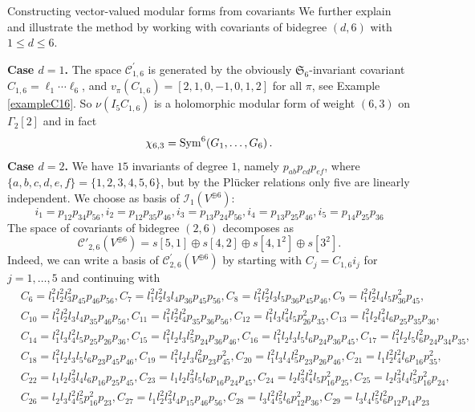 \documentclass[12pt]{amsart}
\numberwithin{equation}{section}
\def\leq{\leqslant}
\numberwithin{equation}{section}
\theoremstyle{definition}
\theoremstyle{remark}
\begin{document}
\begin{section}{Constructing vector-valued modular forms from covariants}
\bigskip
We further explain and illustrate the method by working with covariants of bidegree $(d,6)$
with $1 \leq d \leq 6$. 


\noindent
{\bf Case $d=1$.} The space 
$\mathcal{C}^{\prime}_{1,6}$ is generated by the obviously $\mathfrak{S}_6$-invariant 
covariant $C_{1,6}=\ell_1\cdots \ell_6$,
and $v_{\pi}(C_{1,6})=[2,1,0,-1,0,1,2]$ for all $\pi$, see Example \ref{exampleC16}. 
So $\nu(I_5C_{1,6})$ is a holomorphic modular form  
of weight $(6,3)$ on $\Gamma_2[2]$ and in fact
$$
\chi_{6,3}= {\rm Sym}^6(G_1,\ldots,G_6) \, .
$$
{\bf Case $d=2$.} 
We have $15$ invariants of degree $1$, namely $p_{ab}p_{cd}p_{ef}$, where
$\{a,b,c,d,e,f\}=\{1,2,3,4,5,6\}$, but by the Pl\"ucker relations only five
are linearly independent. We choose as basis of $\mathcal{I}_1(V^{\oplus 6})$:
\[
i_1=p_{12}p_{34}p_{56}, 
i_2=p_{12}p_{35}p_{46}, 
i_3=p_{13}p_{24}p_{56}, 
i_4=p_{13}p_{25}p_{46}, 
i_5=p_{14}p_{25}p_{36}
\]
The space of covariants of bidegree $(2,6)$ decomposes as
\[
\mathcal{C}'_{2,6}(V^{\oplus 6})=s[5,1]\oplus s[4,2]\oplus s[4,1^2] \oplus s[3^2].
\]
Indeed, we can write a basis of $\mathcal{C}_{2,6}^{\prime}(V^{\oplus 6})$  by starting with
$C_{j} = C_{1,6} i_{j}$ for $j=1,\ldots,5$ 
and continuing with
\begin{align*}
&C_{6} = l_{1}^{2} l_{2}^{2} l_{3}^{2} p_{45} p_{46} p_{56}, 
C_{7} = l_{1}^{2} l_{2}^{2} l_{3} l_{4} p_{36} p_{45} p_{56}, 
C_{8} = l_{1}^{2} l_{2}^{2} l_{3} l_{5} p_{36} p_{45} p_{46}, 
C_{9} = l_{1}^{2} l_{2}^{2} l_{4} l_{5} p_{36}^{2} p_{45}, \\
&C_{10} = l_{1}^{2} l_{2}^{2} l_{3} l_{4} p_{35} p_{46} p_{56}, 
C_{11} = l_{1}^{2} l_{2}^{2} l_{4}^{2} p_{35} p_{36} p_{56}, 
C_{12} = l_{1}^{2} l_{3} l_{4}^{2} l_{5} p_{26}^{2} p_{35}, 
C_{13} = l_{1}^{2} l_{2} l_{4}^{2} l_{6} p_{25} p_{35} p_{36}, \\
&C_{14} = l_{1}^{2} l_{3} l_{4}^{2} l_{5} p_{25} p_{26} p_{36}, 
C_{15} = l_{1}^{2} l_{2} l_{3} l_{5}^{2} p_{24} p_{36} p_{46}, 
C_{16} = l_{1}^{2} l_{2} l_{3} l_{5} l_{6} p_{24} p_{36} p_{45}, 
C_{17} = l_{1}^{2} l_{2} l_{5} l_{6}^{2} p_{24} p_{34} p_{35}, \\
&C_{18} = l_{1}^{2} l_{2} l_{3} l_{5} l_{6} p_{23} p_{45} p_{46}, 
C_{19} = l_{1}^{2} l_{2} l_{3} l_{6}^{2} p_{23} p_{45}^{2}, 
C_{20} = l_{1}^{2} l_{3} l_{4} l_{5}^{2} p_{23} p_{26} p_{46}, 
C_{21} = l_{1} l_{2}^{2} l_{4}^{2} l_{6} p_{16} p_{35}^{2}, \\
&C_{22} = l_{1} l_{2} l_{3}^{2} l_{4} l_{6} p_{16} p_{25} p_{45}, 
C_{23} = l_{1} l_{2} l_{3}^{2} l_{5} l_{6} p_{16} p_{24} p_{45}, 
C_{24} = l_{2} l_{3}^{2} l_{4}^{2} l_{5} p_{16}^{2} p_{25}, 
C_{25} = l_{2} l_{3}^{2} l_{4} l_{5}^{2} p_{16}^{2} p_{24}, \\
&C_{26} = l_{2} l_{3} l_{4}^{2} l_{5}^{2} p_{16}^{2} p_{23}, 
C_{27} = l_{1} l_{2}^{2} l_{3}^{2} l_{4} p_{15} p_{46} p_{56}, 
C_{28} = l_{3} l_{4}^{2} l_{5}^{2} l_{6} p_{12}^{2} p_{36}, 
C_{29} = l_{3} l_{4} l_{5}^{2} l_{6}^{2} p_{12} p_{14} p_{23}
\end{align*}


\end{section}
\end{document}
